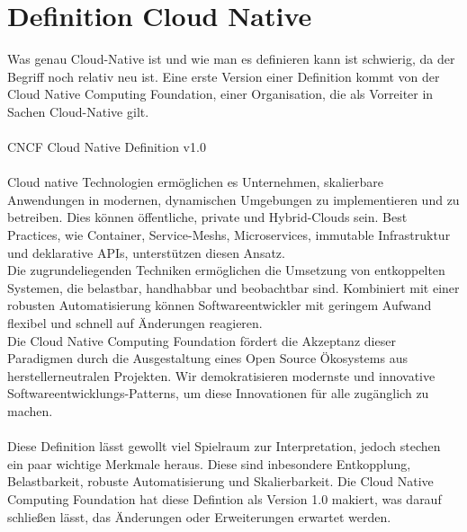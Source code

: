 \section{Definition Cloud Native}
Was genau Cloud-Native ist und wie man es definieren kann ist schwierig, da der Begriff noch relativ neu ist. Eine erste Version einer Definition kommt von der Cloud Native Computing Foundation, einer Organisation, die als Vorreiter in Sachen Cloud-Native gilt.\\
\\
CNCF Cloud Native Definition v1.0\\
\\
Cloud native Technologien ermöglichen es Unternehmen, skalierbare Anwendungen in modernen, dynamischen Umgebungen zu implementieren und zu betreiben. Dies können öffentliche, private und Hybrid-Clouds sein. Best Practices, wie Container, Service-Meshs, Microservices, immutable Infrastruktur und deklarative APIs, unterstützen diesen Ansatz.
\\
Die zugrundeliegenden Techniken ermöglichen die Umsetzung von entkoppelten Systemen, die belastbar, handhabbar und beobachtbar sind. Kombiniert mit einer robusten Automatisierung können Softwareentwickler mit geringem Aufwand flexibel und schnell auf Änderungen reagieren.
\\
Die Cloud Native Computing Foundation fördert die Akzeptanz dieser Paradigmen durch die Ausgestaltung eines Open Source Ökosystems aus herstellerneutralen Projekten. Wir demokratisieren modernste und innovative Softwareentwicklungs-Patterns, um diese Innovationen für alle zugänglich zu machen.\\
\\
Diese Definition lässt gewollt viel Spielraum zur Interpretation, jedoch stechen ein paar wichtige Merkmale heraus. Diese sind inbesondere Entkopplung, Belastbarkeit, robuste Automatisierung und Skalierbarkeit. Die Cloud Native Computing Foundation hat diese Defintion als Version 1.0 makiert, was darauf schließen lässt, das Änderungen oder Erweiterungen erwartet werden.

